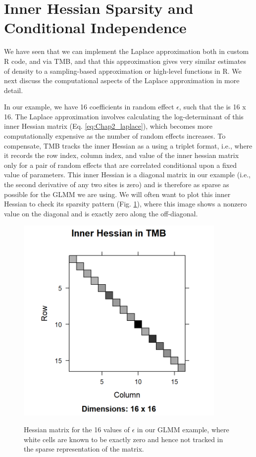 \section{Inner Hessian Sparsity and Conditional Independence} \label{sec:Chap2_Hessian_sparsity}

We have seen that we can implement the Laplace approximation both in custom R code, and via TMB, and that this approximation gives very similar estimates of density to a sampling-based approximation or high-level functions in R.  We next discuss the computational aspects of the Laplace approximation in more detail.

In our example, we have 16 coefficients in random effect \(\epsilon\), such that the  is 16 x 16. The Laplace approximation involves calculating the log-determinant of this inner Hessian matrix (Eq. \ref{eq:Chap2_laplace}), which becomes more computationally expensive as the number of random effects increases. To compensate, TMB tracks the inner Hessian as a  using a triplet format, i.e., where it records the row index, column index, and value of the inner hessian matrix only for a pair of random effects that are correlated conditional upon a fixed value of parameters.  This inner Hessian is a diagonal matrix in our example (i.e., the second derivative of any two sites is zero) and is therefore as sparse as possible for the GLMM we are using.  We will often want to plot this inner Hessian to check its sparsity pattern (Fig. \ref{fig:Chap2_hessian}), where this image shows a nonzero value on the diagonal and is exactly zero along the off-diagonal.

\begin{figure}[!ht]
    \caption[Sparsity pattern for generalized linear mixed model]{Hessian matrix for the 16 values of \(\epsilon\) in our GLMM example, where white cells are known to be exactly zero and hence not tracked in the sparse representation of the matrix.}
    \centering
    \includegraphics[width=4in]{Chap_2/TMB_hessian.png}
    \label{fig:Chap2_hessian}
\end{figure}

